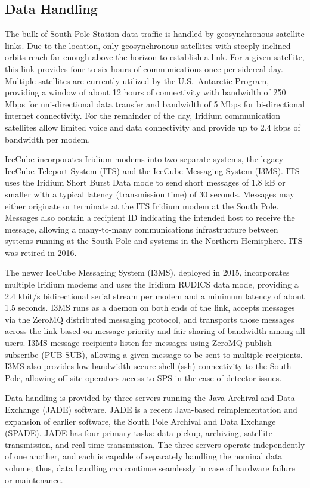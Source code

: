 \subsection{\label{sect:online_jade}Data Handling}

The bulk of South Pole Station data traffic is handled by geosynchronous
satellite links.  Due to the location, only
geosynchronous satellites with steeply inclined orbits reach far enough
above the horizon to establish a link.  For a given satellite, this link
provides four to six hours of communications once per sidereal day.
Multiple satellites are currently utilized by the
U.S.~Antarctic Program, providing a window of about 12 hours of connectivity with
bandwidth of 250 Mbps for uni-directional data transfer and bandwidth
of 5 Mbps for bi-directional internet connectivity.  For the remainder of the day, Iridium
communication satellites allow limited voice and data connectivity and provide up to 2.4
kbps of bandwidth per modem.

IceCube incorporates Iridium modems into two separate systems, the legacy IceCube
Teleport System (ITS) and the IceCube Messaging System (I3MS).  ITS uses
the Iridium Short Burst Data mode to send short 
messages of 1.8 kB or smaller with a typical latency (transmission time) of 30 seconds.
Messages may either originate or terminate at the ITS Iridium modem at the
South Pole.  Messages also contain a recipient ID indicating the intended
host to receive the message, allowing a many-to-many communications
infrastructure between systems running at the South Pole and systems in the
Northern Hemisphere.  ITS was retired in 2016.

The newer IceCube Messaging System (I3MS), deployed in 2015, incorporates
multiple Iridium modems and uses the Iridium RUDICS data mode, providing a
2.4 kbit/s bidirectional serial stream per modem and a minimum latency of
about 1.5 seconds.  I3MS runs as a daemon on both ends of the link, accepts
messages via the ZeroMQ distributed messaging protocol, and transports
those messages across the link based on message priority and fair sharing
of bandwidth among all users. I3MS message recipients listen for messages
using ZeroMQ publish-subscribe (PUB-SUB), allowing a given message to be
sent to multiple recipients.  I3MS also provides low-bandwidth secure shell
(ssh) connectivity to the South Pole, allowing off-site operators
access to SPS in the case of detector issues.

Data handling is provided by three servers running the Java Archival and
Data Exchange (JADE) software. JADE is a
recent Java-based reimplementation and expansion of earlier software, the
South Pole Archival and Data Exchange (SPADE).  JADE has 
four primary tasks: data pickup, archiving, satellite transmission, and
real-time transmission. The three servers operate independently of one
another, and each is capable of separately handling the nominal
data volume; thus, data handling can continue seamlessly in case of
hardware failure or maintenance. 

